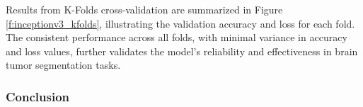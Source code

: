 Results from K-Folds cross-validation are summarized in Figure \ref{f:inceptionv3_kfolds}, illustrating the validation accuracy and loss for each fold. The consistent performance across all folds, with minimal variance in accuracy and loss values, further validates the model's reliability and effectiveness in brain tumor segmentation tasks.



\subsubsection{Conclusion}


